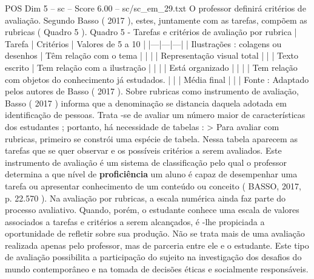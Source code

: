 \begin{textsample}{POS Dim 5 – sc – Score 6.00 – sc/sc\_em\_29.txt}
O professor definirá critérios de avaliação.
Segundo Basso ( 2017 ), estes, juntamente com as tarefas, compõem as rubricas ( Quadro 5 ).
Quadro 5 - Tarefas e critérios de avaliação por rubrica | Tarefa | Critérios | Valores de 5 a 10 | |---|---|---| | Ilustrações : colagens ou desenhos | Têm relação com o tema | | | | Representação visual total | | | Texto escrito | Tem relação com a ilustração | | | | Está organizado | | | | Tem relação com objetos do conhecimento já estudados. | | | Média final | | | Fonte : Adaptado pelos autores de Basso ( 2017 ).
Sobre rubricas como instrumento de avaliação, Basso ( 2017 ) informa que a denominação se distancia daquela adotada em identificação de pessoas.
Trata -se de avaliar um número maior de características dos estudantes ; portanto, há necessidade de tabelas : > Para avaliar com rubricas, primeiro se constrói uma espécie de tabela.
Nessa tabela aparecem as tarefas que se quer observar e os possíveis critérios a serem avaliados.
Este instrumento de avaliação é um sistema de classificação pelo qual o professor determina a que nível de \textbf{proficiência} um aluno é capaz de desempenhar uma tarefa ou apresentar conhecimento de um conteúdo ou conceito ( BASSO, 2017, p. 22.570 ).
Na avaliação por rubricas, a escala numérica ainda faz parte do processo avaliativo.
Quando, porém, o estudante conhece uma escala de valores associados a tarefas e critérios a serem alcançados, é -lhe propiciada a oportunidade de refletir sobre sua produção.
Não se trata mais de uma avaliação realizada apenas pelo professor, mas de parceria entre ele e o estudante.
Este tipo de avaliação possibilita a participação do sujeito na investigação dos desafios do mundo contemporâneo e na tomada de decisões éticas e socialmente responsáveis.

\end{textsample}
